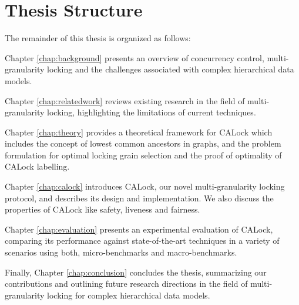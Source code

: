 \section{Thesis Structure}
The remainder of this thesis is organized as follows:

 Chapter \ref{chap:background} presents an overview of concurrency control, multi-granularity locking and the challenges associated with complex hierarchical data models. 

 Chapter \ref{chap:relatedwork} reviews existing research in the field of multi-granularity locking, highlighting the limitations of current techniques. 

 Chapter \ref{chap:theory} provides a theoretical framework for CALock which includes the concept of lowest common ancestors in graphs, and the problem formulation for optimal locking grain selection and the proof of optimality of CALock labelling.

 Chapter \ref{chap:calock} introduces CALock, our novel multi-granularity locking protocol, and describes its design and implementation. We also discuss the properties of CALock like safety, liveness and fairness.


 

 Chapter \ref{chap:evaluation} presents an experimental evaluation of CALock, comparing its performance against state-of-the-art techniques in a variety of scenarios using both, micro-benchmarks and macro-benchmarks.
 
 Finally, Chapter \ref{chap:conclusion} concludes the thesis, summarizing our contributions and outlining future research directions in the field of multi-granularity locking for complex hierarchical data models.


